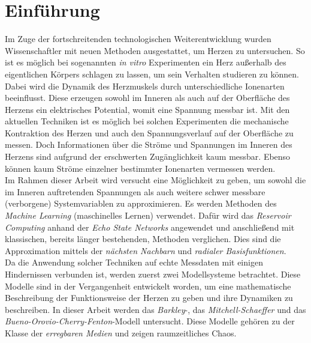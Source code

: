 \chapter{Einführung}
Im Zuge der fortschreitenden technologischen Weiterentwicklung wurden Wissenschaftler mit neuen Methoden ausgestattet, um Herzen zu untersuchen. So ist es möglich bei sogenannten \textit{in vitro} Experimenten ein Herz außerhalb des eigentlichen Körpers schlagen zu lassen, um sein Verhalten studieren zu können. Dabei wird die Dynamik des Herzmuskels durch unterschiedliche Ionenarten beeinflusst. Diese erzeugen sowohl im Inneren als auch auf der Oberfläche des Herzens ein elektrisches Potential, womit eine Spannung messbar ist. Mit den aktuellen Techniken ist es möglich bei solchen Experimenten die mechanische Kontraktion des Herzen und auch den Spannungsverlauf auf der Oberfläche zu messen. Doch Informationen über die Ströme und Spannungen im Inneren des Herzens sind aufgrund der erschwerten Zugänglichkeit kaum messbar. Ebenso können kaum Ströme einzelner bestimmter Ionenarten vermessen werden. \\

Im Rahmen dieser Arbeit wird versucht eine Möglichkeit zu geben, um sowohl die im Inneren auftretenden Spannungen als auch weitere schwer messbare (verborgene) Systemvariablen zu approximieren. Es werden Methoden des \textit{Machine Learning} (maschinelles Lernen) verwendet. Dafür wird das \textit{Reservoir Computing} anhand der \textit{Echo State Networks} angewendet und anschließend mit klassischen, bereits länger bestehenden, Methoden verglichen. Dies sind die Approximation mittels der \textit{nächsten Nachbarn} und \textit{radialer Basisfunktionen}.\\
  
Da die Anwendung solcher Techniken auf echte Messdaten mit einigen Hindernissen verbunden ist, werden zuerst zwei Modellsysteme betrachtet. Diese Modelle sind in der Vergangenheit entwickelt worden, um eine mathematische Beschreibung der Funktionsweise der Herzen zu geben und ihre Dynamiken zu beschreiben. In dieser Arbeit werden das \textit{Barkley}-, das \textit{Mitchell-Schaeffer} und das \textit{Bueno-Orovio-Cherry-Fenton}-Modell untersucht. Diese Modelle gehören zu der Klasse der \textit{erregbaren Medien} und zeigen raumzeitliches Chaos.\\

